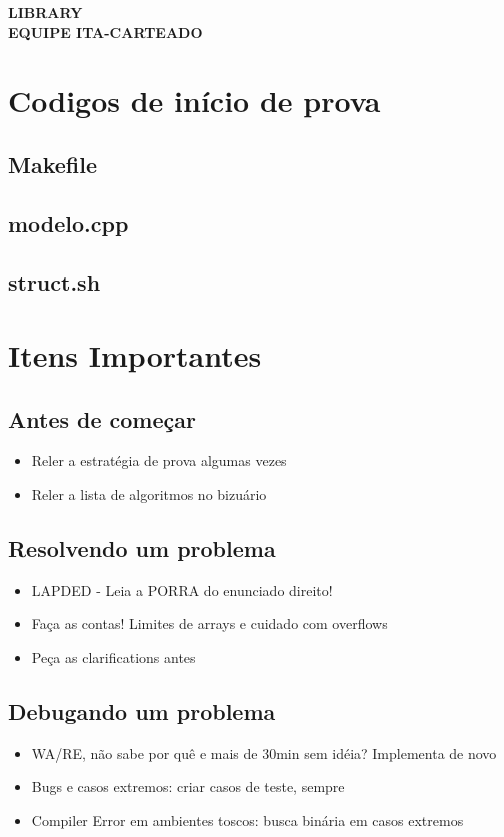\documentclass[oneside, landscape, twocolumn, a4wide, 9pt]{scrartcl}
\begin{document}
\begin{center}
{\bf
  LIBRARY\\
  EQUIPE ITA-CARTEADO\\}
\end{center}
\vspace{-0.5cm}
\tableofcontents
\thispagestyle{fancyplain}

\section{Codigos de início de prova}
\subsection{Makefile}
\subsection{modelo.cpp}
\subsection{struct.sh}

\section{Itens Importantes}
\subsection{Antes de começar}
\begin{itemize}
\item Reler a estratégia de prova algumas vezes
\item Reler a lista de algoritmos no bizuário
\end{itemize}
\subsection{Resolvendo um problema}
\begin{itemize}
\item LAPDED - Leia a PORRA do enunciado direito!
\item Faça as contas! Limites de arrays e cuidado com overflows
\item Peça as clarifications antes
\end{itemize}
\subsection{Debugando um problema}
\begin{itemize}
\item WA/RE, não sabe por quê e mais de 30min sem idéia? Implementa de novo
\item Bugs e casos extremos: criar casos de teste, sempre
\item Compiler Error em ambientes toscos: busca binária em casos extremos
\end{itemize}
\end{document}
